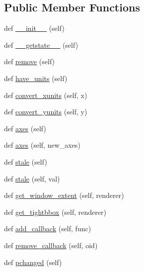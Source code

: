 \subsection*{Public Member Functions}
\begin{DoxyCompactItemize}
\item 
def \hyperlink{classmatplotlib_1_1artist_1_1Artist_a08b09d4b2ca8065bbd3632e8fc370d12}{\+\_\+\+\_\+init\+\_\+\+\_\+} (self)
\item 
def \hyperlink{classmatplotlib_1_1artist_1_1Artist_ac571a37a5d90b332a5836c9bfcd9df4d}{\+\_\+\+\_\+getstate\+\_\+\+\_\+} (self)
\item 
def \hyperlink{classmatplotlib_1_1artist_1_1Artist_a2db9fb3a04630ec165858e8ffd4f6a0d}{remove} (self)
\item 
def \hyperlink{classmatplotlib_1_1artist_1_1Artist_a90a8117b79947b16d3f5ceb1e1111e93}{have\+\_\+units} (self)
\item 
def \hyperlink{classmatplotlib_1_1artist_1_1Artist_a77aa2acdfe80ad0031d4b434cd198967}{convert\+\_\+xunits} (self, x)
\item 
def \hyperlink{classmatplotlib_1_1artist_1_1Artist_a4cd38a5326740325a19be14a13492048}{convert\+\_\+yunits} (self, y)
\item 
def \hyperlink{classmatplotlib_1_1artist_1_1Artist_a5519c6dadebe26f2972017de81ef963b}{axes} (self)
\item 
def \hyperlink{classmatplotlib_1_1artist_1_1Artist_a522c38874d287df85bbf5af7c770a3e7}{axes} (self, new\+\_\+axes)
\item 
def \hyperlink{classmatplotlib_1_1artist_1_1Artist_af914fd5701b9ee325e83386af4929483}{stale} (self)
\item 
def \hyperlink{classmatplotlib_1_1artist_1_1Artist_ae5c12acde0393d4c115b39d736c96d88}{stale} (self, val)
\item 
def \hyperlink{classmatplotlib_1_1artist_1_1Artist_a7bf805a7628ab4d77eb838158ad1ca6a}{get\+\_\+window\+\_\+extent} (self, renderer)
\item 
def \hyperlink{classmatplotlib_1_1artist_1_1Artist_a69562533787dbd3772d3da3b2d97a1ff}{get\+\_\+tightbbox} (self, renderer)
\item 
def \hyperlink{classmatplotlib_1_1artist_1_1Artist_a816f7d16a84b68d1281320fce9c299ab}{add\+\_\+callback} (self, func)
\item 
def \hyperlink{classmatplotlib_1_1artist_1_1Artist_a856701800af1bb57d880bf07465db0e7}{remove\+\_\+callback} (self, oid)
\item 
def \hyperlink{classmatplotlib_1_1artist_1_1Artist_a2a0afb32e4bb80f08e96099ccc92c00f}{pchanged} (self)

\end{DoxyCompactItemize}
